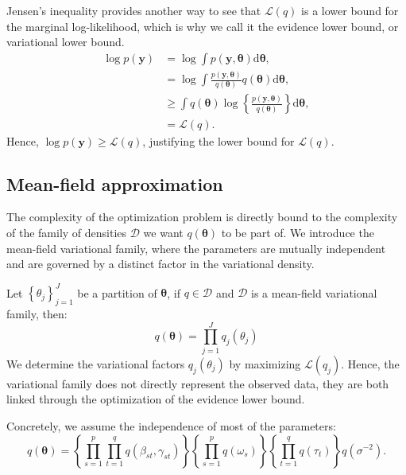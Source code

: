 \documentclass{article}
\numberwithin{equation}{section}
\begin{document}
Jensen's inequality provides another way to see that $\mathcal{L}(q)$ is a lower bound for the marginal log-likelihood, which is why we call it the evidence lower bound, or variational lower bound.
\begin{align*}
\log p(\boldsymbol{y}) &= \log \int p(\boldsymbol{y}, \boldsymbol{\theta}) \mathrm{d}\boldsymbol{\theta},\\
&= \log \int \frac{p(\boldsymbol{y}, \boldsymbol{\theta})}{q(\boldsymbol{\theta})}q(\boldsymbol{\theta})\mathrm{d}\boldsymbol{\theta}
,\\
&\geq \int q(\boldsymbol{\theta}) \log \left\lbrace \frac{p(\boldsymbol{y}, \boldsymbol{\theta})}{q(\boldsymbol{\theta})} \right\rbrace \mathrm{d}\boldsymbol{\theta},\\
&= \mathcal{L}(q).
\end{align*}
Hence, $\log p(\boldsymbol{y}) \geq \mathcal{L}(q)$, justifying the lower bound for $\mathcal{L}(q)$.

\subsection{Mean-field approximation}
The complexity of the optimization problem is directly bound to the complexity of the family of densities $\mathcal{D}$ we want $q(\boldsymbol{\theta})$ to be part of. We introduce the mean-field variational family, where the parameters are mutually independent and are governed by a distinct factor in the variational density.

Let $\left\lbrace \theta_j\right\rbrace_{j=1}^J$ be a partition of $\boldsymbol{\theta}$, if $q \in \mathcal{D}$ and $\mathcal{D}$ is a mean-field variational family, then:
\begin{equation*}
q(\boldsymbol{\theta}) = \prod_{j=1}^J q_j(\theta_j)
\end{equation*}
We determine the variational factors $q_j(\theta_j)$ by maximizing $\mathcal{L}(q_j)$. Hence, the variational family does not directly represent the observed data, they are both linked through the optimization of the evidence lower bound.

Concretely, we assume the independence of most of the parameters:
\begin{equation*}
q(\boldsymbol{\theta}) =\left\lbrace\prod_{s=1}^p \prod_{t=1}^q q(\beta_{st}, \gamma_{st})\right\rbrace \left\lbrace\prod_{s=1}^p  q(\omega_s)\right\rbrace \left\lbrace\prod_{t=1}^q q(\tau_t)\right\rbrace q(\sigma^{-2}).
\end{equation*}
\end{document}
